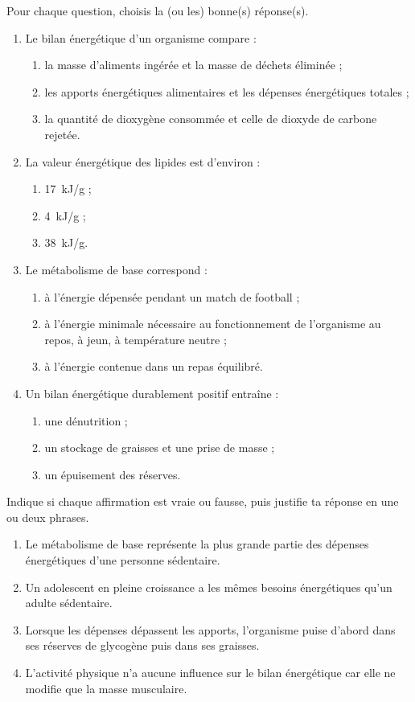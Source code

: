 \documentclass[11pt]{article}
\begin{document}
\begin{exercice}
Pour chaque question, choisis la (ou les) bonne(s) réponse(s).
\begin{enumerate}
\item Le bilan énergétique d'un organisme compare :
\begin{enumerate}
\item la masse d'aliments ingérée et la masse de déchets éliminée ;
\item les apports énergétiques alimentaires et les dépenses énergétiques totales ;
\item la quantité de dioxygène consommée et celle de dioxyde de carbone rejetée.
\end{enumerate}
\item La valeur énergétique des lipides est d'environ :
\begin{enumerate}
\item \SI{17}{kJ/g} ; \item \SI{4}{kJ/g} ; \item \SI{38}{kJ/g}.
\end{enumerate}
\item Le métabolisme de base correspond :
\begin{enumerate}
\item à l'énergie dépensée pendant un match de football ;
\item à l'énergie minimale nécessaire au fonctionnement de l'organisme au repos, à jeun, à température neutre ;
\item à l'énergie contenue dans un repas équilibré.
\end{enumerate}
\item Un bilan énergétique durablement positif entraîne :
\begin{enumerate}
\item une dénutrition ; \item un stockage de graisses et une prise de masse ; \item un épuisement des réserves.
\end{enumerate}
\end{enumerate}
\end{exercice}

\begin{exercice}
Indique si chaque affirmation est vraie ou fausse, puis justifie ta réponse en une ou deux phrases.
\begin{enumerate}
\item Le métabolisme de base représente la plus grande partie des dépenses énergétiques d'une personne sédentaire.
\item Un adolescent en pleine croissance a les mêmes besoins énergétiques qu'un adulte sédentaire.
\item Lorsque les dépenses dépassent les apports, l'organisme puise d'abord dans ses réserves de glycogène puis dans ses graisses.
\item L'activité physique n'a aucune influence sur le bilan énergétique car elle ne modifie que la masse musculaire.
\end{enumerate}
\end{exercice}
\end{document}
